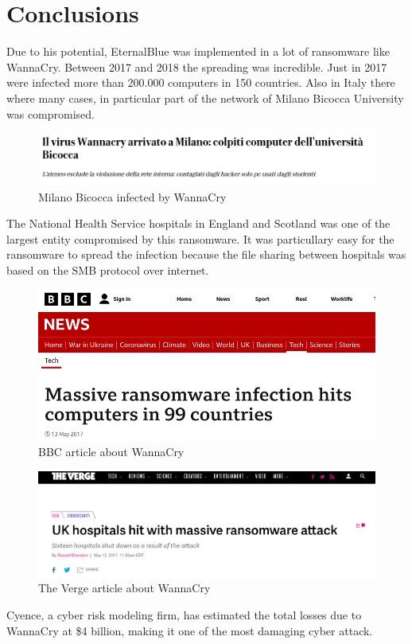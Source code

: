 \section{Conclusions}
Due to his potential, EternalBlue was implemented in a lot of ransomware like WannaCry. Between 2017
and 2018 the spreading was incredible. Just in 2017 were infected more than 200.000 computers in 150 countries.
Also in Italy there where many cases, in particular part of the network of Milano Bicocca University was compromised.\\
\begin{figure}[ht!]
    \centering
      \includegraphics[scale=0.3]{images/bicocca.png}
      \caption{Milano Bicocca infected by WannaCry}
\end{figure}

\noindent The National Health Service hospitals in England and Scotland was one of the largest entity compromised by this ransomware. It was particullary 
easy for the ransomware to spread the infection because the file sharing between hospitals was based on the SMB protocol over internet.
\begin{figure}[ht!]
    \centering
      \includegraphics[scale=0.3]{images/bbc.png}
      \caption{BBC article about WannaCry}
\end{figure}

\begin{figure}[ht!]
    \centering
      \includegraphics[scale=0.3]{images/theverge.png}
      \caption{The Verge article about WannaCry}
\end{figure}

\noindent Cyence, a cyber risk modeling firm, has estimated the total losses due to WannaCry at \$4 billion, making it one
of the most damaging cyber attack.
